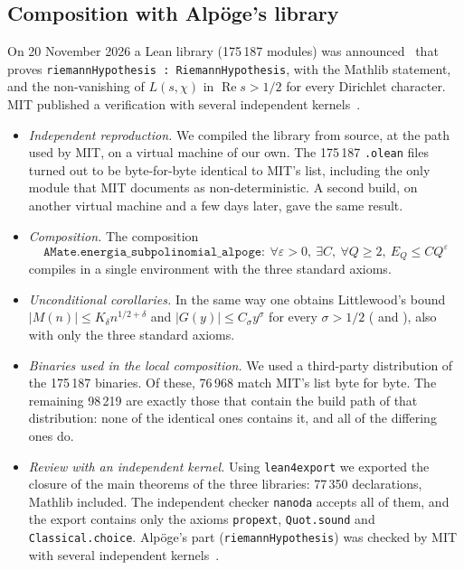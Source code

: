 \documentclass[11pt,a4paper]{amsart}
\theoremstyle{definition}
\theoremstyle{remark}
\renewcommand{\Re}{\operatorname{Re}}
\begin{document}
\subsection*{Composition with Alp\"oge's library}
On 20 November 2026 a Lean library (175\,187 modules) was announced~\cite{Alpoge} that proves \texttt{riemannHypothesis : RiemannHypothesis}, with the Mathlib statement, and the non-vanishing of $L(s,\chi)$ in $\Re s>1/2$ for every Dirichlet character. MIT published a verification with several independent kernels~\cite{MIT}.
\begin{itemize}
\item \emph{Independent reproduction.} We compiled the library from source, at the path used by MIT, on a virtual machine of our own. The 175\,187 \texttt{.olean} files turned out to be byte-for-byte identical to MIT's list, including the only module that MIT documents as non-deterministic. A second build, on another virtual machine and a few days later, gave the same result.
\item \emph{Composition.} The composition
\[
\texttt{AMate.energia\_subpolinomial\_alpoge}:\ \forall\varepsilon>0,\ \exists C,\ \forall Q\ge2,\ E_Q\le CQ^\varepsilon
\]
compiles in a single environment with the three standard axioms.
\item \emph{Unconditional corollaries.} In the same way one obtains Littlewood's bound $|M(n)|\le K_\delta n^{1/2+\delta}$ and $|G(y)|\le C_{\sigma}y^{\sigma}$ for every $\sigma>1/2$ ( and ), also with only the three standard axioms.
\item \emph{Binaries used in the local composition.} We used a third-party distribution of the 175\,187 binaries. Of these, 76\,968 match MIT's list byte for byte. The remaining 98\,219 are exactly those that contain the build path of that distribution: none of the identical ones contains it, and all of the differing ones do.
\item \emph{Review with an independent kernel.} Using \texttt{lean4export} we exported the closure of the main theorems of the three libraries: 77\,350 declarations, Mathlib included. The independent checker \texttt{nanoda} accepts all of them, and the export contains only the axioms \texttt{propext}, \texttt{Quot.sound} and \texttt{Classical.choice}. Alp\"oge's part (\texttt{riemannHypothesis}) was checked by MIT with several independent kernels~\cite{MIT}.
\end{itemize}
\end{document}
